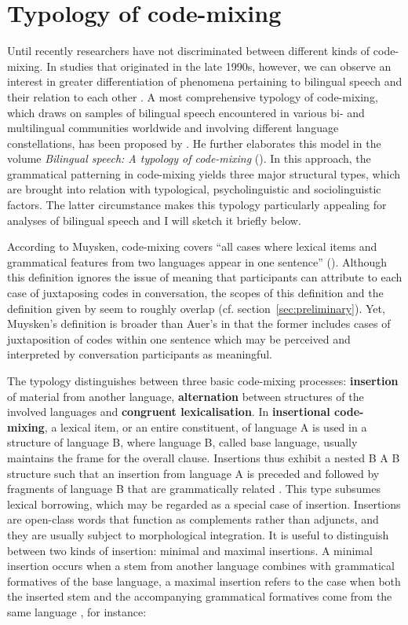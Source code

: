 \section{Typology of code-mixing}
Until recently researchers have not discriminated between different kinds of code-mixing. In studies that originated in the late 1990s, however, we can observe an interest in greater differentiation of phenomena pertaining to bilingual speech and their relation to each other \citep[cf.][]{auer-codeswitching-1999}. A most comprehensive typology of code-mixing, which draws on samples of bilingual speech encountered in various bi- and multilingual communities worldwide and involving different language constellations, has been proposed by \citet{muysken-code-switching-1997}. He further elaborates this model in the volume \textit{Bilingual speech: A typology of code-mixing} (\citeyear{muysken-bilingual-2000}). In this approach, the grammatical patterning in code-mixing yields three major structural types, which are brought into relation with typological, psycholinguistic and sociolinguistic factors. The latter circumstance makes this typology particularly appealing for analyses of bilingual speech and I will sketch it briefly below.

According to Muysken, code-mixing covers ``all cases where lexical items and grammatical features from two languages appear in one sentence'' (\citeyear[][1]{muysken-bilingual-2000}). Although this definition ignores the issue of meaning that participants can attribute to each case of juxtaposing codes in conversation, the scopes of this definition and the definition given by \citet{auer-codeswitching-1999} seem to roughly overlap (cf. section~\ref{sec:preliminary}). Yet, Muysken's definition is broader than Auer's in that the former includes cases of juxtaposition of codes within one sentence which may be perceived and interpreted by conversation participants as meaningful.

The typology distinguishes between three basic code-mixing processes: \textbf{insertion} of material from another language, \textbf{alternation} between structures of the involved languages and \textbf{congruent lexicalisation}. In \textbf{insertional code-mixing}, a lexical item, or an entire constituent, of language A is used in a structure of language B, where language B, called base language, usually maintains the frame for the overall clause. Insertions thus exhibit a nested B A B structure such that an insertion from language A is preceded and followed by fragments of language B that are grammatically related \citep[cf.][61--69]{muysken-bilingual-2000}. This type subsumes lexical borrowing, which may be regarded as a special case of insertion. Insertions are open-class words that function as complements rather than adjuncts, and they are usually subject to morphological integration. It is useful to distinguish between two kinds of insertion: minimal and maximal insertions. A minimal insertion occurs when a stem from another language combines with grammatical formatives of the base language, a maximal insertion refers to the case when both the inserted stem and the accompanying grammatical formatives come from the same language \citep[cf.][]{auer2014}, for instance:

